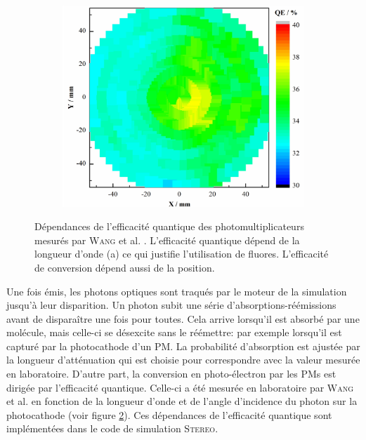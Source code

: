{\begin{figure}[h!]
\begin{subfigure}[b]{0.44\textwidth}
\centering
\includegraphics[width=1\textwidth]{images/position_dependant_quantum_eff.jpg}
\caption{}
\label{fig:position_dependant_quantum_eff.jpg}

\end{subfigure}
\caption[Dépendances de l'efficacité quantique des photomultiplicateurs]{Dépendances de l'efficacité quantique des photomultiplicateurs mesurés par \textsc{Wang} et al. \cite{Wang:2015vla}. L'efficacité quantique dépend de la longueur d'onde (a) ce qui justifie l'utilisation de fluores. L'efficacité de conversion dépend aussi de la position. }
\label{fig:PM_quantum_eff}
\end{figure}

}

Une fois émis, les photons optiques sont traqués par le moteur de la simulation jusqu'à leur disparition. Un photon subit une série d'absorptions-réémissions avant de disparaître une fois pour toutes. Cela arrive lorsqu'il est absorbé par une molécule, mais celle-ci se désexcite sans le réémettre: par exemple lorsqu'il est capturé par la photocathode d'un PM. La probabilité d'absorption est ajustée par la longueur d'atténuation qui est choisie pour correspondre avec la valeur mesurée en laboratoire. D'autre part, la conversion en photo-électron par les PMs est dirigée par l'efficacité quantique. Celle-ci a été mesurée en laboratoire par \textsc{Wang} et al. \cite{Wang:2015vla} en fonction de la longueur d'onde et de l'angle d'incidence du photon sur la photocathode (voir figure \ref{fig:PM_quantum_eff}). Ces dépendances de l'efficacité quantique sont implémentées dans le code de simulation \textsc{Stereo}.\\

